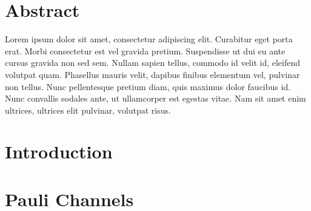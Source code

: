 \documentclass[10pt,letterpaper]{article} %
\begin{document}
\section*{Abstract}
Lorem ipsum dolor sit amet, consectetur adipiscing elit. Curabitur eget porta erat. Morbi consectetur est vel gravida pretium. Suspendisse ut dui eu ante cursus gravida non sed sem. Nullam sapien tellus, commodo id velit id, eleifend volutpat quam. Phasellus mauris velit, dapibus finibus elementum vel, pulvinar non tellus. Nunc pellentesque pretium diam, quis maximus dolor faucibus id. Nunc convallis sodales ante, ut ullamcorper est egestas vitae. Nam sit amet enim ultrices, ultrices elit pulvinar, volutpat risus.



\linenumbers

\section*{Introduction} %


\section{Pauli Channels}  \label{sec: Pauli Channels} %

\end{document}
